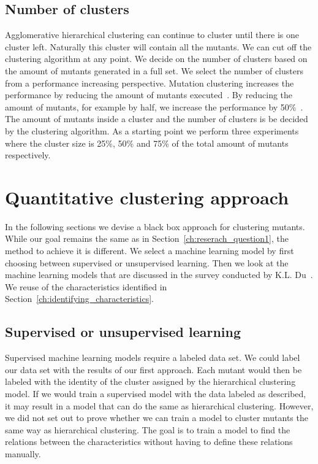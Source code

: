 \documentclass[conference,draftclsnofoot,onecolumn]{IEEEtran}
\begin{document}
\subsection{Number of clusters}
Agglomerative hierarchical clustering can continue to cluster until there is one cluster left. 
Naturally this cluster will contain all the mutants.
We can cut off the clustering algorithm at any point.
We decide on the number of clusters based on the amount of mutants generated in a full set.
We select the number of clusters from a performance increasing perspective.
Mutation clustering increases the performance by reducing the amount of mutants executed~\cite{Pizzoleto2019}.
By reducing the amount of mutants, for example by half, we increase the performance by 50\%~\cite{Just2014AreTesting}.
The amount of mutants inside a cluster and the number of clusters is be decided by the clustering algorithm.
As a starting point we perform three experiments where the cluster size is 25\%, 50\% and 75\% of the total amount of mutants respectively.


\section{Quantitative clustering approach}
\label{ch:reserach_question2}
In the following sections we devise a black box approach for clustering mutants. While our goal remains the same as in Section~\ref{ch:reserach_question1}, the method to achieve it is different. We select a machine learning model by first choosing between supervised or unsupervised learning.
Then we look at the machine learning models that are discussed in the survey conducted by K.L. Du~\cite{Du2010Clustering:Approach}.
We reuse of the characteristics identified in 
Section~\ref{ch:identifying_characteristics}.

\subsection{Supervised or unsupervised learning}
Supervised machine learning models require a labeled data set. We could label our data set with the results of our first approach. Each mutant would then be labeled with the identity of the cluster assigned by the hierarchical clustering model. If we would train a supervised model with the data labeled as described, it may result in a model that can do the same as hierarchical clustering.
However, we did not set out to prove whether we can train a model to cluster mutants the same way as hierarchical clustering. The goal is to train a model to find the relations between the characteristics without having to define these relations manually.
\end{document}
